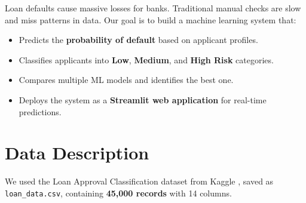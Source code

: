 \documentclass[12pt, a4paper]{article}
\begin{document}
Loan defaults cause massive losses for banks. Traditional manual checks are slow and miss patterns in data. Our goal is to build a machine learning system that:

\begin{itemize}[leftmargin=2cm]
  \item Predicts the \textbf{probability of default} based on applicant profiles.
  \item Classifies applicants into \textbf{Low}, \textbf{Medium}, and \textbf{High Risk} categories.
  \item Compares multiple ML models and identifies the best one.
  \item Deploys the system as a \textbf{Streamlit web application} for real-time predictions.
\end{itemize}

\section{Data Description}

We used the Loan Approval Classification dataset from Kaggle \cite{kaggle_dataset}, saved as \texttt{loan\_data.csv}, containing \textbf{45,000 records} with 14 columns.
\end{document}
